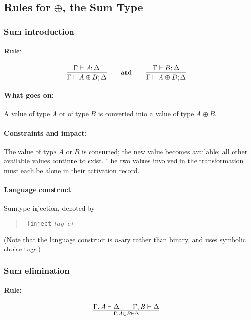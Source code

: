 \documentclass[a4paper]{article}
\begin{document}

\subsection{Rules for $\oplus$, the Sum Type}


\subsubsection{Sum introduction}
\paragraph{Rule:}
$$
{{
  \Gamma \vdash A;\Delta
}\over{
  \Gamma \vdash A \oplus B;\Delta
}}
\qquad \textrm{and} \qquad
{{
  \Gamma \vdash B;\Delta
}\over{
  \Gamma \vdash A \oplus B;\Delta
}}
$$

\paragraph{What goes on:} A value of type $A$ or of type $B$ is
converted into a value of type $A \oplus B$.

\paragraph{Constraints and impact:} The value of type $A$ or $B$ is
consumed; the new value becomes available; all other available values
continue to exist.
The two values involved in the transformation must each be alone in
their activation record.

\paragraph{Language construct:} Sumtype injection, denoted by
\begin{quote}\tt
  (inject $\mathit{tag}$ $e$)
\end{quote}
(Note that the language construct is $n$-ary rather than binary, and
uses symbolic choice tags.)


\subsubsection{Sum elimination}
\paragraph{Rule:}
$$
{
  \Gamma,A \vdash \Delta \qquad \Gamma,B \vdash \Delta
}\over{
  \Gamma, A\oplus B \vdash \Delta
}
$$
\end{document}
